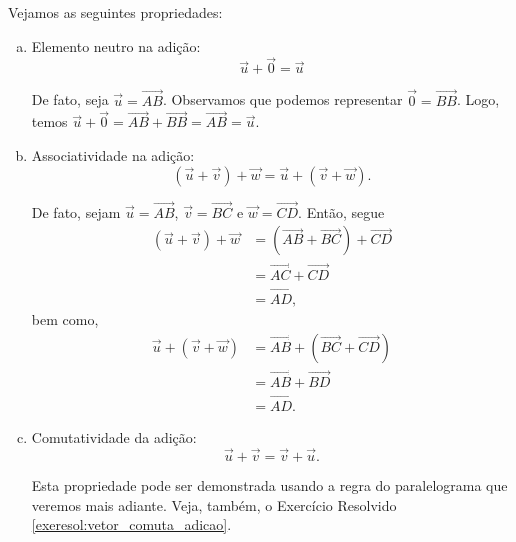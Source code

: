\begin{obs}
  Vejamos as seguintes propriedades:
  \begin{enumerate}[a)]
  \item Elemento neutro na adição:
    \begin{equation}
      \vec{u} + \vec{0} = \vec{u}
    \end{equation}
    
    De fato, seja $\vec{u} = \overrightarrow{AB}$. Observamos que podemos representar $\vec{0} = \overrightarrow{BB}$. Logo, temos $\vec{u} + \vec{0} = \overrightarrow{AB} + \overrightarrow{BB} = \overrightarrow{AB} = \vec{u}$.

  \item Associatividade na adição:
    \begin{equation}
      (\vec{u} + \vec{v}) + \vec{w} = \vec{u} + (\vec{v} + \vec{w}).
    \end{equation}

    De fato, sejam $\vec{u} = \overrightarrow{AB}$, $\vec{v} = \overrightarrow{BC}$ e $\vec{w} = \overrightarrow{CD}$. Então, segue
    \begin{align}
      \left(\vec{u} + \vec{v}\right)+\vec{w} &= \left(\overrightarrow{AB}+\overrightarrow{BC}\right)+\overrightarrow{CD} \\
                                             &= \overrightarrow{AC} + \overrightarrow{CD} \\
                                             &= \overrightarrow{AD},
    \end{align}
    bem como,
    \begin{align}
      \vec{u} + \left(\vec{v} + \vec{w}\right) &= \overrightarrow{AB}+\left(\overrightarrow{BC}+\overrightarrow{CD}\right) \\
                                             &= \overrightarrow{AB} + \overrightarrow{BD} \\
                                             &= \overrightarrow{AD}.
    \end{align}
  \item Comutatividade da adição:
    \begin{equation}
      \vec{u} + \vec{v} = \vec{v} + \vec{u}.
    \end{equation}

    Esta propriedade pode ser demonstrada usando a regra do paralelograma que veremos mais adiante. Veja, também, o Exercício Resolvido \ref{exeresol:vetor_comuta_adicao}.
  \end{enumerate}
\end{obs}


